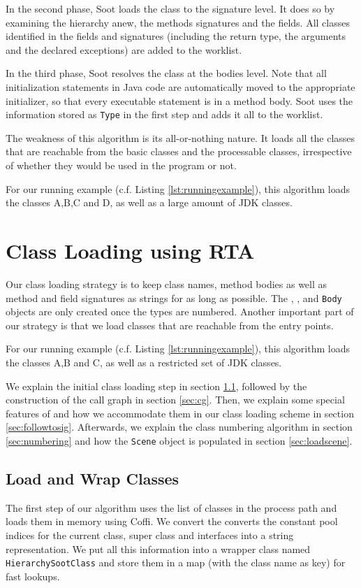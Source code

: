 \documentclass[preprint]{sigplanconf}
\begin{document}
In the second phase, Soot loads the class to the signature level. It does so by examining the hierarchy anew, the methods signatures and the fields. All classes identified in the fields and signatures (including the return type, the arguments and the declared exceptions) are added to the worklist.

In the third phase, Soot resolves the class at the bodies level. Note that all initialization statements in Java code are automatically moved to the appropriate initializer, so that every executable statement is in a method body. Soot uses the information stored as {\tt Type} in the first step and adds it all to the worklist.

The weakness of this algorithm is its all-or-nothing nature. It loads all the classes that are reachable from the basic classes and the processable classes, irrespective of whether they would be used in the program or not.

For our running example (c.f. Listing \ref{lst:runningexample}), this algorithm loads the classes A,B,C and D, as well as a large amount of JDK classes.

\section{Class Loading using RTA}
\label{sec:new-cl}
Our class loading strategy is to keep class names, method bodies as well as method and field signatures as strings for as long as possible.
The \sootclass, \sootmethod, \sootfield and {\tt Body} objects are only created once the types are numbered. Another important part of our strategy is that we load classes that are reachable from the entry points.

For our running example (c.f. Listing \ref{lst:runningexample}), this algorithm loads the classes A,B and C, as well as a restricted set of JDK classes. %

We explain the initial class loading step in section \ref{sec:loading}, followed by the construction of the call graph in section \ref{sec:cg}. Then, we explain some special features of \rb and how we accommodate them in our class loading scheme in section \ref{sec:followtosig}. Afterwards, we explain the class numbering algorithm in section \ref{sec:numbering} and how the {\tt Scene} object is populated in section \ref{sec:loadscene}.

\subsection{Load and Wrap Classes}
\label{sec:loading}
The first step of our algorithm uses the list of classes in the process path and loads them in memory using Coffi. We convert the  converts the constant pool indices for the current class, super class and interfaces into a string representation. We put all this information into a wrapper class named {\tt HierarchySootClass} and store them in a map (with the class name as key) for fast lookups.
\end{document}
